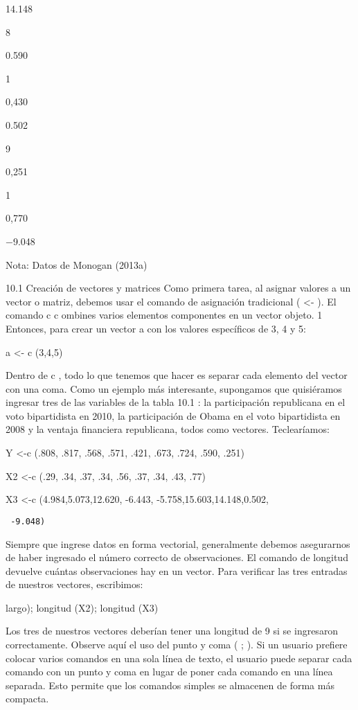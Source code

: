\documentclass[
]{book}
\begin{document}
14.148

8

0.590

1

0,430

0.502

9

0,251

1

0,770

−9.048

Nota: Datos de Monogan (2013a)

10.1 Creación de vectores y matrices
Como primera tarea, al asignar valores a un vector o matriz, debemos usar el comando de asignación tradicional ( \textless- ). El comando c c ombines varios elementos componentes en un vector objeto. 1 Entonces, para crear un vector a con los valores específicos de 3, 4 y 5:

a \textless- c (3,4,5)

Dentro de c , todo lo que tenemos que hacer es separar cada elemento del vector con una coma. Como un ejemplo más interesante, supongamos que quisiéramos ingresar tres de las variables de la tabla 10.1 : la participación republicana en el voto bipartidista en 2010, la participación de Obama en el voto bipartidista en 2008 y la ventaja financiera republicana, todos como vectores. Teclearíamos:

Y \textless-c (.808, .817, .568, .571, .421, .673, .724, .590, .251)

X2 \textless-c (.29, .34, .37, .34, .56, .37, .34, .43, .77)

X3 \textless-c (4.984,5.073,12.620, -6.443, -5.758,15.603,14.148,0.502,

\begin{verbatim}
 -9.048)
\end{verbatim}

Siempre que ingrese datos en forma vectorial, generalmente debemos asegurarnos de haber ingresado el número correcto de observaciones. El comando de longitud devuelve cuántas observaciones hay en un vector. Para verificar las tres entradas de nuestros vectores, escribimos:

largo); longitud (X2); longitud (X3)

Los tres de nuestros vectores deberían tener una longitud de 9 si se ingresaron correctamente. Observe aquí el uso del punto y coma ( ; ). Si un usuario prefiere colocar varios comandos en una sola línea de texto, el usuario puede separar cada comando con un punto y coma en lugar de poner cada comando en una línea separada. Esto permite que los comandos simples se almacenen de forma más compacta.
\end{document}
